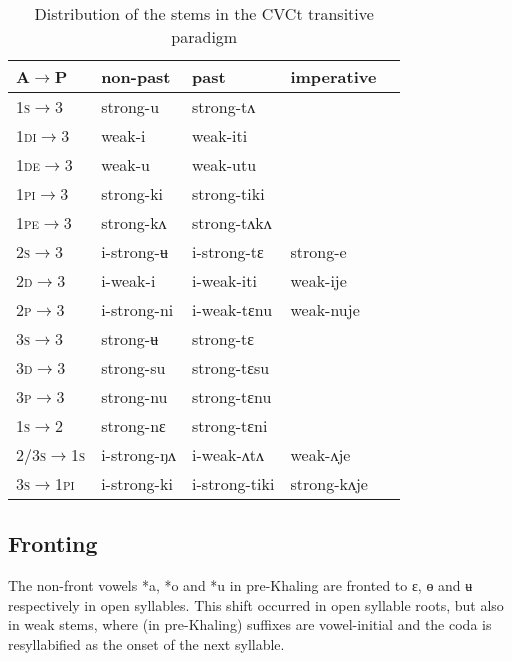 \documentclass[oldfontcommands,oneside,a4paper,11pt]{article}
\newcommand{\ipa}[1]{{\phon \mbox{#1}}} %
\newcommand{\grise}[1]{\cellcolor{lightgray}\textbf{#1}}
\begin{document}
\begin{table}[H]
\caption{Distribution of the stems in the CVCt transitive paradigm } \label{tab:trans.cvct.paradigm} \centering
\begin{tabular}{lllll}
\toprule
A$\rightarrow$P& non-past & past &imperative\\
\midrule
\textsc{1s}$\rightarrow$3 & strong-\ipa{u}\grise{}  & strong-\ipa{tʌ} \\
\textsc{1di}$\rightarrow$3 & weak-\ipa{i} & weak-\ipa{iti} \\
\textsc{1de}$\rightarrow$3 & weak-\ipa{u} & weak-\ipa{utu} \\
\textsc{1pi}$\rightarrow$3 & strong-\ipa{ki} & strong-\ipa{tiki} \\
\textsc{1pe}$\rightarrow$3 & strong-\ipa{kʌ} & strong-\ipa{tʌkʌ} \\
\textsc{2s}$\rightarrow$3 & \ipa{i}-strong-\ipa{ʉ} \grise{} & \ipa{i}-strong-\ipa{tɛ}  &strong-\ipa{e} \grise{} \\
\textsc{2d}$\rightarrow$3 & \ipa{i}-weak-\ipa{i} & \ipa{i}-weak-\ipa{iti} &weak-\ipa{ije}\\
\textsc{2p}$\rightarrow$3 & \ipa{i}-strong-\ipa{ni} & \ipa{i}-weak-\ipa{tɛnu}\grise{} &weak-\ipa{nuje}\grise{}\\
\textsc{3s}$\rightarrow$3 & strong-\ipa{ʉ} \grise{} & strong-\ipa{tɛ}\\
\textsc{3d}$\rightarrow$3 & strong-\ipa{su} & strong-\ipa{tɛsu}   \\
\textsc{3p}$\rightarrow$3 & strong-\ipa{nu} & strong-\ipa{tɛnu}\\
\midrule
\textsc{1s}$\rightarrow$2 & strong-\ipa{nɛ} & strong-\ipa{tɛni}\\
\textsc{2/3s$\rightarrow$1s} & \ipa{i}-strong-\ipa{ŋʌ} & \ipa{i}-weak-\ipa{ʌtʌ} & weak-\ipa{ʌje}\\
\textsc{3s$\rightarrow$1pi} & \ipa{i}-strong-\ipa{ki} & \ipa{i}-strong-\ipa{tiki} & strong-\ipa{kʌje}\\
\bottomrule
\end{tabular}
\end{table}



\subsection{Fronting} \label{sec:fronting}
The non-front vowels *\ipa{a}, *\ipa{o} and *\ipa{u} in pre-Khaling are fronted to \ipa{ɛ}, \ipa{ɵ} and \ipa{ʉ} respectively in open syllables. This shift occurred in   open syllable roots, but also in weak stems, where (in pre-Khaling) suffixes are vowel-initial and the coda is resyllabified as the onset of the next syllable. 
\end{document}
